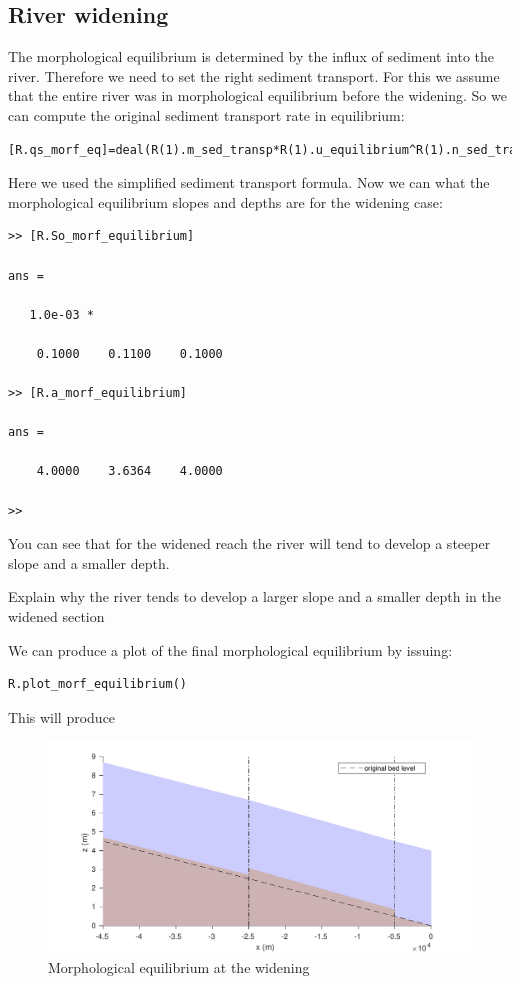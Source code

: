 \documentclass[a4paper]{article}
\begin{document}
\subsection{River widening}
The morphological equilibrium is determined by the influx of sediment into the river. Therefore we need to set the right sediment transport. For this we assume that the entire river was in morphological equilibrium before the widening. So we can compute the original sediment transport rate in equilibrium:
\begin{lstlisting}
[R.qs_morf_eq]=deal(R(1).m_sed_transp*R(1).u_equilibrium^R(1).n_sed_transp);
\end{lstlisting}
Here we used the simplified sediment transport formula. 
Now we can what the morphological equilibrium slopes and depths are for the widening case:
\begin{lstlisting}
>> [R.So_morf_equilibrium]

ans =

   1.0e-03 *

    0.1000    0.1100    0.1000

>> [R.a_morf_equilibrium]

ans =

    4.0000    3.6364    4.0000

>> 
\end{lstlisting}
You can see that for the widened reach the river will tend to develop a steeper slope and a smaller depth.
\begin{exercise}
  Explain why the river tends to develop a larger slope and a smaller depth in the widened section
\end{exercise}
We can produce a plot of the final morphological equilibrium by issuing:
\begin{lstlisting}
R.plot_morf_equilibrium()
\end{lstlisting}
This will produce
\begin{figure}[ht]
  \centering
  \includegraphics[width=\linewidth]{matlab/morfeq_widening.pdf}
  \caption{Morphological equilibrium at the widening}
  \label{fig:morfeq_widening}
\end{figure}
\end{document}
